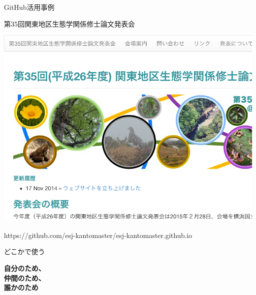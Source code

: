 \documentclass[ignorenonframetext,]{beamer}
\begin{document}
\begin{frame}{\faGithub GitHub活用事例}

第35回関東地区生態学関係修士論文発表会

\includegraphics[scale = 0.4]{images/webshot_esj_master_kanto.png}

\tiny{https://github.com/esj-kantomaster/esj-kantomaster.github.io}

\end{frame}

\begin{frame}{どこかで使う}

\large{\textbf{\textcolor{Orange1}{\faUser 自分のため、\\\faGroup 仲間のため、\\\faGlobe 誰かのため}}}

\end{frame}
\end{document}

